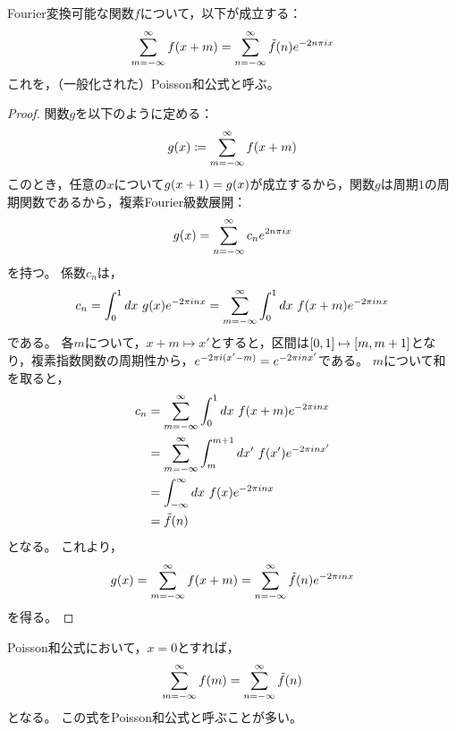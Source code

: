 \documentclass[a4paper,draft]{ltjsarticle}
\begin{document}
\begin{thm}[Poisson和公式]
    Fourier変換可能な関数$f$について，以下が成立する：
    \begin{equation}
        \sum_{m=-\infty}^\infty \fun{f}{x+m} = \sum_{n=-\infty}^\infty \fun{\tilde{f}}{n}e^{-2n\pi i x}
    \end{equation}
    これを，（一般化された）Poisson和公式と呼ぶ。

    \begin{proof}
        関数$g$を以下のように定める：
        \begin{equation}
            \fun{g}{x}\coloneqq \sum_{m=-\infty}^\infty \fun{f}{x+m}
        \end{equation}
        このとき，任意の$x$について$\fun{g}{x+1}=\fun{g}{x}$が成立するから，関数$g$は周期$1$の周期関数であるから，複素Fourier級数展開：
        \begin{equation}
            \fun{g}{x}=\sum_{n=-\infty}^\infty c_n e^{2n\pi i x}
        \end{equation}
        を持つ。
        係数$c_n$は，
        \begin{equation}
            c_n=\int_0^1 dx\ \fun{g}{x} e^{-2\pi i nx}
            = \sum_{m=-\infty}^\infty \int_0^1 dx\ \fun{f}{x+m}e^{-2\pi i nx}
        \end{equation}
        である。
        各$m$について，$x+m\mapsto x'$とすると，区間は$\squ{0,1}\mapsto\squ{m,m+1}$となり，複素指数関数の周期性から，$e^{-2\pi i ( x'-m )}=e^{-2\pi i nx'}$である。
        $m$について和を取ると，
        \begin{align}
            c_n
            &=\sum_{m=-\infty}^\infty \int_0^1 dx\ \fun{f}{x+m}e^{-2 \pi i n x}
            \\
            &=\sum_{m=-\infty}^\infty \int_m^{m+1} dx'\ \fun{f}{x'}e^{-2\pi i nx'}
            \\
            &=\int_{-\infty}^\infty dx\ \fun{f}{x}e^{-2\pi i n x}
            \\
            &=\fun{\tilde{f}}{n}
        \end{align}
        となる。
        これより，
        \begin{equation}
            \fun{g}{x}=\sum_{m=-\infty}^\infty \fun{f}{x+m}=\sum_{n=-\infty}^\infty \fun{\tilde{f}}{n}e^{-2\pi i nx}
        \end{equation}
        を得る。
    \end{proof}
\end{thm}

\begin{cor}[Poisson和公式]
    Poisson和公式において，$x=0$とすれば，
    \begin{equation}
        \sum_{m=-\infty}^\infty \fun{f}{m}=\sum_{n=-\infty}^\infty \fun{\tilde{f}}{n}
    \end{equation}
    となる。
    この式をPoisson和公式と呼ぶことが多い。
\end{cor}
\end{document}
